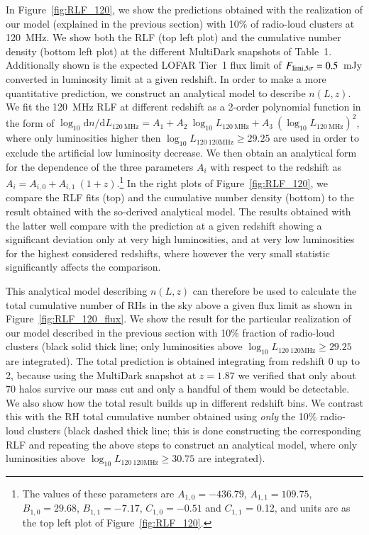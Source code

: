 \documentclass[traditabstract]{aa}
\newcommand{\rmn}{\mathrm}
\begin{document}
In Figure~\ref{fig:RLF_120}, we show the predictions obtained with the realization of our model (explained in the previous section) with 10\% of radio-loud clusters at 120~MHz. We show both the RLF (top left plot) and the cumulative number density (bottom left plot) at the different MultiDark snapshots of Table~1. Additionally shown is the expected LOFAR Tier~1 flux limit of $F_{\rm{limi},5\sigma}=0.5$~mJy \citep{2012JApA..tmp...34R} converted in luminosity limit at a given redshift. In order to make a more quantitative prediction, we construct an analytical model to describe $n(L,z)$. We fit the 120~MHz RLF at different redshift as a 2-order polynomial function in the form of $\log_{10} \rmn{d}n/\rmn{d}L_{120~\rmn{MHz}} = A_{1} + A_{2}~\log_{10} L_{120~\rmn{MHz}} + A_{3}~(\log_{10} L_{120~\rmn{MHz}})^{2}$, where only luminosities higher then $\log_{10} L_{120~\rmn{120MHz}} \geq 29.25$ are used in order to exclude the artificial low luminosity decrease. We then obtain an analytical form for the dependence of the three parameters $A_{i}$ with respect to the redshift as $A_{i} = A_{i,0} + A_{i,1}~(1+z)$.\footnote[15]{The values of these parameters are $A_{1,0} = -436.79$, $A_{1,1} = 109.75$, $B_{1,0} = 29.68$, $B_{1,1} = -7.17$, $C_{1,0} = -0.51$ and $C_{1,1}$ = 0.12, and units are as the top left plot of Figure~\ref{fig:RLF_120}.} In the right plots of Figure~\ref{fig:RLF_120}, we compare the RLF fits (top) and the cumulative number density (bottom) to the result obtained with the so-derived analytical model. The results obtained with the latter well compare with the prediction at a given redshift showing a significant deviation only at very high luminosities, and at very low luminosities for the highest considered redshifts, where however the very small statistic significantly affects the comparison. 

This analytical model describing $n(L,z)$ can therefore be used to calculate the total cumulative number of RHs in the sky above a given flux limit as shown in Figure~\ref{fig:RLF_120_flux}. We show the result for the particular realization of our model described in the previous section with 10\% fraction of radio-loud clusters (black solid thick line; only luminosities above $\log_{10} L_{120~\rmn{120MHz}} \geq 29.25$ are integrated). The total prediction is obtained integrating from redshift 0 up to 2, because using the MultiDark snapshot at $z = 1.87$ we verified that only about 70 halos survive our mass cut and only a handful of them would be detectable. We also show how the total result builds up in different redshift bins. We contrast this with the RH total cumulative number obtained using \emph{only} the 10\% radio-loud clusters (black dashed thick line; this is done constructing the corresponding RLF and repeating the above steps to construct an analytical model, where only luminosities above $\log_{10} L_{120~\rmn{120MHz}} \geq 30.75$ are integrated). 
\end{document}
